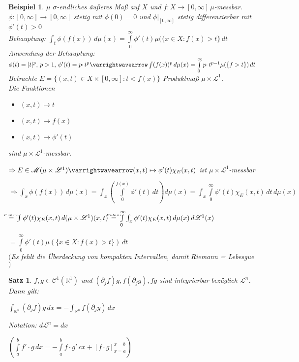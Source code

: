 \documentclass[11pt]{memoir}
\theoremstyle{changebreak}
\newtheorem{Beispiel}{Beispiel}[chapter]
\newtheorem{Satz}{Satz}[chapter]
\newcommand\overequal[1]{\mathrel{\overset{\makebox[0pt]{\mbox{\normalfont\tiny\sffamily $ #1 $}}}{=}}}
\begin{document}


\begin{Beispiel}
$\mu$ $\sigma$-endliches äußeres Maß auf $X$ und $f: X \rightarrow [0, \infty]\, \mu$-messbar. \\
$\phi: [0, \infty] \rightarrow [0, \infty]$ stetig mit $\phi(0) = 0$ und $\phi\lvert_{[0, \infty]}$ stetig differenzierbar mit $\phi'(t) >0$ \\
\emph{Behauptung}:
$\int_t \phi(f(x)) \, d\mu(x) = \int\limits_0^\infty \phi'(t)\mu(\{x \in X: f(x) >t\} \, dt$\\
\emph{Anwendung der Behauptung}:  \\
$\phi(t) = |t|^p, \, p>1, \, \phi'(t) = p \cdotp t^p \varrightwavearrow \int(f(x))^p \, d\mu(x) = \int\limits_0^\infty p\cdotp t^{p-1} \mu(\{f > t\}) \, dt$ \\
Betrachte $E = \{(x, t) \in X \times [0, \infty]: t < f(x)\}$ Produktmaß $\mu \times \mathscr L^1$. \\
Die Funktionen
\begin{itemize}
	\item $(x, t) \mapsto t$
	\item $(x, t) \mapsto f(x)$
	\item $(x, t) \mapsto \phi'(t)$
\end{itemize}
sind $\mu \times \mathscr L^1$-messbar. \\
\par
$\Rightarrow E \in \mathscr M(\mu \times \mathscr L^1) \varrightwavearrow (x, t) \mapsto \phi'(t) \chi_E(x, t)$ ist $\mu \times \mathscr L^1$-messbar \\
\par
$\Rightarrow \int_x \phi(f(x)) \, d\mu(x) = \int_x \left( \int\limits_0^{f(x)}\phi'(t)\, dt\right)d\mu(x) = \int_x\int\limits_0^\infty \phi'(t) \chi_E(x, t)\, dt \,d\mu(x)$
\par
$\overequal{Fubini}\, \int \phi'(t) \chi_E(x, t) \,d(\mu \times \mathscr L^1)(x, t) \,\overequal{Fubini} \,\int\limits_0^\infty \int_x \phi'(t)\chi_E(x, t) \,d\mu(x) \,d\mathscr L^1(x)$
\par
$ = \int\limits_0^\infty \phi'(t) \mu(\{x \in X: f(x) >t\})\, dt$ \\
$($Es fehlt die Überdeckung von kompakten Intervallen, damit Riemann = Lebesgue$)$
\end{Beispiel}

\begin{Satz}
$f, g\in \mathscr C^1(\mathbb R^1)$ und $(\partial_j f)g, f(\partial_j g), fg$ sind integrierbar bezüglich $\mathscr L^n$. Dann gilt:
\begin{center}
	$\int_{\mathbb R^n} (\partial_j f)g \, dx = - \int_{\mathbb R^n} f(\partial_j y) \, dx$
	\par\bigskip
	\emph{Notation}: $d\mathscr L^n = dx$
	\par\bigskip
	$\left(\int\limits_a^b f' \cdotp g \,dx = -\int\limits_a^b f\cdotp g' \, cx + [f\cdotp g]_{x=a}^{x=b} \right)$
\end{center}
\end{Satz}
\end{document}
